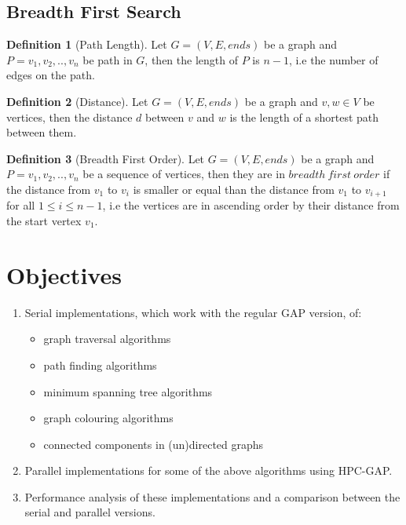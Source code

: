 \documentclass{report}
\theoremstyle{plain}
\theoremstyle{definition}
\newtheorem{definition}{Definition}
\theoremstyle{remark}
\begin{document}
\section*{Breadth First Search}

\begin{definition}[Path Length]
Let $G = (V, E, ends)$ be a graph and $P=v_1,v_2,..,v_n$ be path in $G$, then the length of $P$ is $n-1$, i.e the number of edges on the path. 
\end{definition}

\begin{definition}[Distance]
Let $G = (V, E, ends)$ be a graph and $v, w \in V$ be vertices, then the distance $d$ between $v$ and $w$ is the length of a shortest path between them. 
\end{definition}

\begin{definition}[Breadth First Order]
Let $G = (V, E, ends)$ be a graph and $P=v_1,v_2,..,v_n$ be a sequence of vertices, then they are in $breadth \ first \ order$ if the distance from $v_1$ to $v_i$ is smaller or equal than the distance from $v_1$ to $v_{i+1}$ for all $1 \leq i \leq n - 1$, i.e the vertices are in ascending order by their distance from the start vertex $v_1$.
\end{definition}

\chapter{Objectives}
\begin{enumerate}
  \item Serial implementations, which work with the regular GAP version, of:
  \begin{itemize}
    \item graph traversal algorithms
    \item path finding algorithms
    \item minimum spanning tree algorithms
    \item graph colouring algorithms
    	\item connected components in (un)directed graphs
  \end{itemize}
  \item Parallel implementations for some of the above algorithms using HPC-GAP.
  \item Performance analysis of these implementations and a comparison between the serial and parallel versions.
\end{enumerate}
\end{document}
